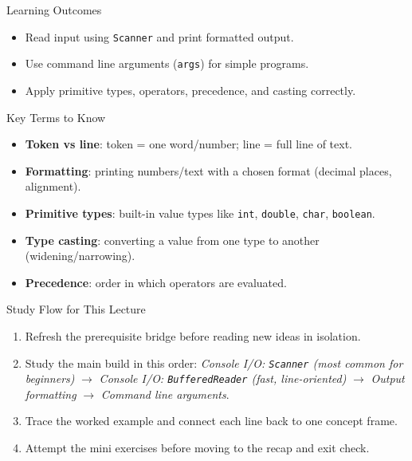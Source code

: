 \documentclass{beamer}
\begin{document}
\begin{frame}{Learning Outcomes}
  \begin{itemize}[<+->]
    \item Read input using \texttt{Scanner} and print formatted output.
    \item Use command line arguments (\texttt{args}) for simple programs.
    \item Apply primitive types, operators, precedence, and casting correctly.
  \end{itemize}
  \slidesources{\OOPSUnitISources}
\end{frame}

\begin{frame}{Key Terms to Know}
\begin{itemize}[<+->]
  \item \textbf{Token vs line}: token = one word/number; line = full line of text.
  \item \textbf{Formatting}: printing numbers/text with a chosen format (decimal places, alignment).
  \item \textbf{Primitive types}: built-in value types like \texttt{int}, \texttt{double}, \texttt{char}, \texttt{boolean}.
  \item \textbf{Type casting}: converting a value from one type to another (widening/narrowing).
  \item \textbf{Precedence}: order in which operators are evaluated.
\end{itemize}
  \slidesources{\OOPSUnitISources}
\end{frame}

\begin{frame}{Study Flow for This Lecture}
\begin{enumerate}[<+->]
  \item Refresh the prerequisite bridge before reading new ideas in isolation.
  \item Study the main build in this order: \textit{Console I/O: \texttt{Scanner} (most common for beginners)} $\rightarrow$ \textit{Console I/O: \texttt{BufferedReader} (fast, line-oriented)} $\rightarrow$ \textit{Output formatting} $\rightarrow$ \textit{Command line arguments}.
  \item Trace the worked example and connect each line back to one concept frame.
  \item Attempt the mini exercises before moving to the recap and exit check.
\end{enumerate}
  \slidesources{\OOPSUnitISources}
\end{frame}
\end{document}

